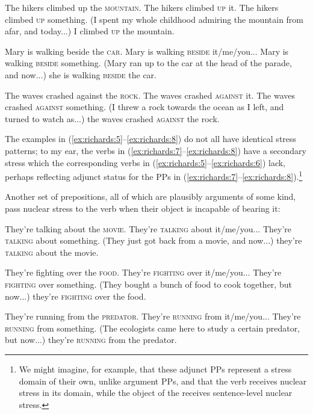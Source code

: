 \documentclass[output=paper]{LSP/langsci}
\begin{document}
\ea%
\label{ex:richards:6}
\ea The hikers climbed up the \textsc{mountain}.
\ex The hikers climbed \textsc{up} it.
\ex The hikers climbed \textsc{up} something.
\ex (I spent my whole childhood admiring the mountain from afar, and today...) I         climbed \textsc{up} the mountain.
\z\z


\ea%
    \label{ex:richards:7}
\ea Mary is walking beside the \textsc{car}.
\ex Mary is walking \textsc{beside} it/me/you...
\ex Mary is walking \textsc{beside} something.
\ex (Mary ran up to the car at the head of the parade, and now...)       she is walking \textsc{beside} the car.
\z
\z

\ea%
    \label{ex:richards:8}
\ea The waves crashed against the \textsc{rock}.
\ex The waves crashed \textsc{against} it.
\ex The waves crashed \textsc{against} something.
\ex (I threw a rock towards the ocean as I left, and turned to watch as...)       the waves crashed \textsc{against} the rock.
\z
\z

The examples in (\ref{ex:richards:5}--\ref{ex:richards:8}) do not all have identical stress patterns; to my ear, the verbs in (\ref{ex:richards:7}--\ref{ex:richards:8}) have a secondary stress which the corresponding verbs in (\ref{ex:richards:5}--\ref{ex:richards:6}) lack, perhaps reflecting adjunct status for the PPs in (\ref{ex:richards:7}--\ref{ex:richards:8}).\footnote{We might imagine, for example, that these adjunct PPs represent a stress domain of their own, unlike argument PPs, and that the verb receives nuclear stress in its domain, while the object of the  receives sentence-level nuclear stress.}

Another set of prepositions, all of which are plausibly arguments of some kind, pass nuclear stress to the verb when their object is incapable of bearing it:


\ea%
    \label{ex:richards:9}
\ea They're talking about the \textsc{movie}.
\ex They're \textsc{talking} about it/me/you...
\ex They're \textsc{talking} about something.
\ex (They just got back from a movie, and now...) they're \textsc{talking} about the movie.
\z
\z

\ea%
    \label{ex:richards:10}
\ea They're fighting over the \textsc{food}.
\ex They're \textsc{fighting} over it/me/you...
\ex They're \textsc{fighting} over something.
\ex (They bought a bunch of food to cook together, but now...)       they're \textsc{fighting} over the food.
\z
\z


\ea%
    \label{ex:richards:11}
\ea They're running from the \textsc{predator}.
\ex They're \textsc{running} from it/me/you...
\ex They're \textsc{running} from something.
\ex (The ecologists came here to study a certain predator, but now...)      they're \textsc{running} from the predator.
\z
\z
\end{document}

